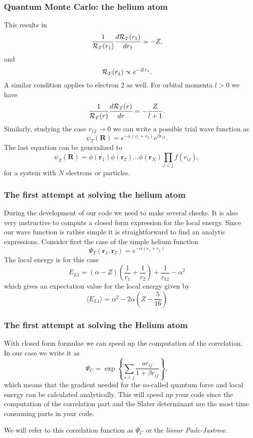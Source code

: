 \documentclass{beamer}
\begin{document}
\begin{frame}
\frametitle{Quantum Monte Carlo: the helium atom}

\begin{block}{}
This results in
\[
     \frac{1}{{\cal R}_T(r_1)}\frac{d {\cal R}_T(r_1)}{dr_1}=-Z,
\]
and
\[
   {\cal R}_T(r_1)\propto e^{-Zr_1}.
\]
A similar condition applies to electron 2 as well. 
For orbital momenta $l > 0$ we have 
\[
     \frac{1}{{\cal R}_T(r)}\frac{d {\cal R}_T(r)}{dr}=-\frac{Z}{l+1}.
\]
Similarly, studying the case $r_{12}\rightarrow 0$ we can write 
a possible trial wave function as
\[
   \psi_T(\bm{R})=e^{-\alpha(r_1+r_2)}e^{\beta r_{12}}.
    \label{eq:wavehelium2}
\]
The last equation can be generalized to
\[
   \psi_T(\bm{R})=\phi(\bm{r}_1)\phi(\bm{r}_2)\dots\phi(\bm{r}_N)
                   \prod_{i < j}f(r_{ij}),
\]
for a system with $N$ electrons or particles. 
\end{block}
\end{frame}

\begin{frame}
\frametitle{The first attempt at solving the helium atom}

\begin{block}{}

During the development of our code we need to make several checks. It is also very instructive to compute a closed form expression for the local energy. Since our wave function is rather simple  it is straightforward
to find an analytic expressions.  Consider first the case of the simple helium function 
\[
   \Psi_T(\bm{r}_1,\bm{r}_2) = e^{-\alpha(r_1+r_2)}
\]
The local energy is for this case 
\[ 
E_{L1} = \left(\alpha-Z\right)\left(\frac{1}{r_1}+\frac{1}{r_2}\right)+\frac{1}{r_{12}}-\alpha^2
\]
which gives an expectation value for the local energy given by
\[
\langle E_{L1} \rangle = \alpha^2-2\alpha\left(Z-\frac{5}{16}\right)
\]
\end{block}
\end{frame}

\begin{frame}
\frametitle{The first attempt at solving the Helium atom}

\begin{block}{}

With closed form formulae we  can speed up the computation of the correlation. In our case
we write it as 
\[
\Psi_C= \exp{\left\{\sum_{i < j}\frac{ar_{ij}}{1+\beta r_{ij}}\right\}},
\]
which means that the gradient needed for the so-called quantum force and local energy 
can be calculated analytically.
This will speed up your code since the computation of the correlation part and the Slater determinant are the most 
time consuming parts in your code.  

We will refer to this correlation function as $\Psi_C$ or the \emph{linear Pade-Jastrow}.
\end{block}
\end{frame}
\end{document}
